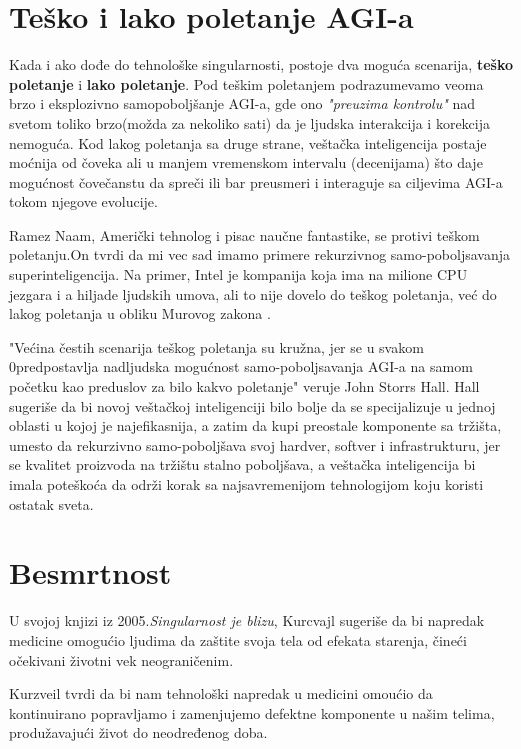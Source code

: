 \documentclass[a4paper]{article}
\begin{document}
\section{Teško i lako poletanje AGI-a}
\label{sec:poletanje}
Kada i ako dođe do tehnološke singularnosti, postoje dva moguća scenarija, \textbf{teško poletanje} i \textbf {lako poletanje}.
Pod teškim poletanjem podrazumevamo veoma brzo i eksplozivno samopoboljšanje AGI-a, gde ono \textit{"preuzima kontrolu"} nad svetom toliko brzo(možda za nekoliko sati) da je ljudska interakcija i korekcija nemoguća. Kod lakog poletanja sa druge strane, veštačka inteligencija postaje moćnija od čoveka ali u manjem vremenskom intervalu (decenijama) što daje mogućnost čovečanstu da spreči ili bar preusmeri i interaguje sa ciljevima AGI-a tokom njegove evolucije.\cite{refe1}

Ramez Naam, Američki tehnolog i pisac naučne fantastike, se protivi teškom poletanju.On tvrdi da mi vec sad imamo primere rekurzivnog samo-poboljsavanja superinteligencija. Na primer, Intel je kompanija koja ima na milione CPU jezgara i a hiljade ljudskih umova, ali to nije dovelo do teškog poletanja, već do lakog poletanja u obliku Murovog zakona \cite{refe2}.

"Većina čestih scenarija teškog poletanja su kružna, jer se u svakom 0predpostavlja nadljudska mogućnost samo-poboljsavanja AGI-a na samom početku kao preduslov za bilo kakvo poletanje" veruje John Storrs Hall. Hall sugeriše da bi novoj veštačkoj inteligenciji bilo bolje da se specijalizuje u jednoj oblasti u kojoj je najefikasnija, a zatim da kupi preostale komponente sa tržišta, umesto da rekurzivno samo-poboljšava svoj hardver, softver i infrastrukturu, jer se kvalitet proizvoda na tržištu stalno poboljšava, a veštačka inteligencija bi imala poteškoća da održi korak sa najsavremenijom tehnologijom koju koristi ostatak sveta.\cite{refe3}

\section{Besmrtnost}
\label{sec:besmrtnost}
  U svojoj knjizi iz 2005.\textit {Singularnost je blizu}, Kurcvajl sugeriše da bi napredak medicine omogućio ljudima da zaštite svoja tela od efekata starenja, čineći očekivani životni vek neograničenim. 
  
  Kurzveil tvrdi da bi nam tehnološki napredak u medicini omoućio da kontinuirano popravljamo i zamenjujemo defektne komponente u našim telima, produžavajući život do neodređenog doba.
\end{document}
